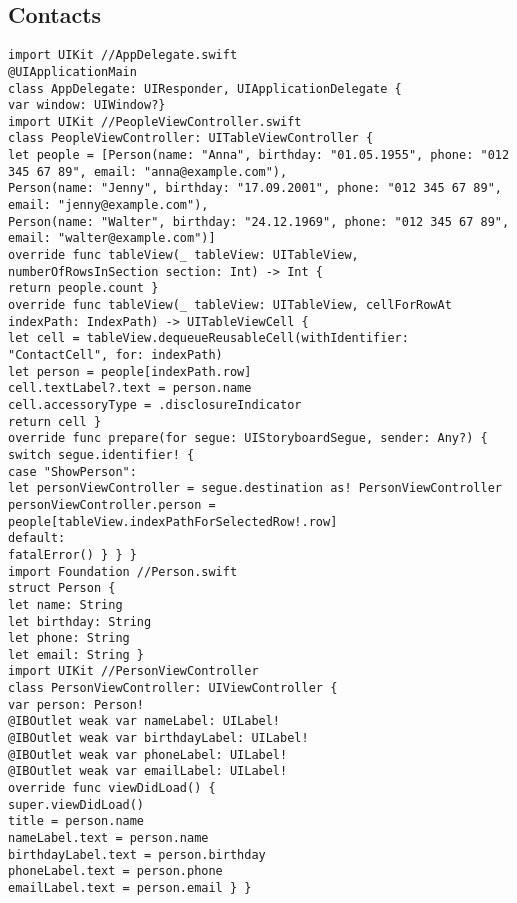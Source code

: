 \subsection{Contacts}
\begin{lstlisting}
import UIKit //AppDelegate.swift
@UIApplicationMain
class AppDelegate: UIResponder, UIApplicationDelegate {
var window: UIWindow?}
import UIKit //PeopleViewController.swift
class PeopleViewController: UITableViewController {
let people = [Person(name: "Anna", birthday: "01.05.1955", phone: "012 345 67 89", email: "anna@example.com"),
Person(name: "Jenny", birthday: "17.09.2001", phone: "012 345 67 89", email: "jenny@example.com"),
Person(name: "Walter", birthday: "24.12.1969", phone: "012 345 67 89", email: "walter@example.com")]
override func tableView(_ tableView: UITableView, numberOfRowsInSection section: Int) -> Int {
return people.count }
override func tableView(_ tableView: UITableView, cellForRowAt indexPath: IndexPath) -> UITableViewCell {
let cell = tableView.dequeueReusableCell(withIdentifier: "ContactCell", for: indexPath)
let person = people[indexPath.row]
cell.textLabel?.text = person.name
cell.accessoryType = .disclosureIndicator
return cell }
override func prepare(for segue: UIStoryboardSegue, sender: Any?) {
switch segue.identifier! {
case "ShowPerson":
let personViewController = segue.destination as! PersonViewController
personViewController.person = people[tableView.indexPathForSelectedRow!.row]
default:
fatalError() } } }
import Foundation //Person.swift
struct Person {
let name: String
let birthday: String
let phone: String
let email: String }
import UIKit //PersonViewController
class PersonViewController: UIViewController {
var person: Person!
@IBOutlet weak var nameLabel: UILabel!
@IBOutlet weak var birthdayLabel: UILabel!
@IBOutlet weak var phoneLabel: UILabel!
@IBOutlet weak var emailLabel: UILabel!
override func viewDidLoad() {
super.viewDidLoad()
title = person.name
nameLabel.text = person.name
birthdayLabel.text = person.birthday
phoneLabel.text = person.phone
emailLabel.text = person.email } }
\end{lstlisting}

